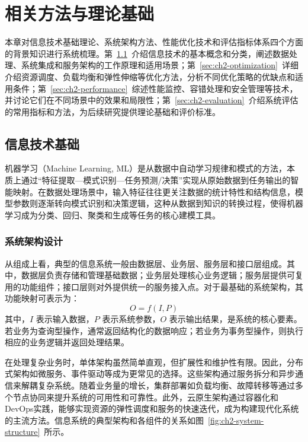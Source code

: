
\chapter{相关方法与理论基础}\label{ch:prelim}

本章对信息技术基础理论、系统架构方法、性能优化技术和评估指标体系四个方面的背景知识进行系统梳理。第~\ref{sec:ch2-fundamentals}~介绍信息技术的基本概念和分类，阐述数据处理、系统集成和服务架构的工作原理和适用场景；第~\ref{sec:ch2-optimization}~详细介绍资源调度、负载均衡和弹性伸缩等优化方法，分析不同优化策略的优缺点和适用条件；第~\ref{sec:ch2-performance}~综述性能监控、容错处理和安全管理等技术，并讨论它们在不同场景中的效果和局限性；第~\ref{sec:ch2-evaluation}~介绍系统评估的常用指标和方法，为后续研究提供理论基础和评价标准。

\section{信息技术基础}\label{sec:ch2-fundamentals}

机器学习（Machine Learning, ML）是从数据中自动学习规律和模式的方法，本质上通过``特征提取---模式识别---任务预测/决策''实现从原始数据到任务输出的智能映射。在数据处理场景中，输入特征往往更关注数据的统计特性和结构信息，模型参数则逐渐转向模式识别和决策逻辑，这种从数据到知识的转换过程，使得机器学习成为分类、回归、聚类和生成等任务的核心建模工具。

\subsection{系统架构设计}\label{sec:ch2-system-structure}

从组成上看，典型的信息系统一般由数据层、业务层、服务层和接口层组成。其中，数据层负责存储和管理基础数据；业务层处理核心业务逻辑；服务层提供可复用的功能组件；接口层则对外提供统一的服务接入点。对于最基础的系统架构，其功能映射可表示为：
\begin{equation}
  O = f(I, P)
\end{equation}
其中，\(I\) 表示输入数据，\(P\) 表示系统参数，\(O\) 表示输出结果，是系统的核心要素。若业务为查询型操作，通常返回结构化的数据响应；若业务为事务型操作，则执行相应的业务逻辑并返回处理结果。

在处理复杂业务时，单体架构虽然简单直观，但扩展性和维护性有限。因此，分布式架构如微服务、事件驱动等成为更常见的选择。这些架构通过服务拆分和异步通信来解耦复杂系统。随着业务量的增长，集群部署如负载均衡、故障转移等通过多个节点协同来提升系统的可用性和可靠性。此外，云原生架构通过容器化和DevOps实践，能够实现资源的弹性调度和服务的快速迭代，成为构建现代化系统的主流方法。信息系统的典型架构和各组件的关系如图~\ref{fig:ch2-system-structure}~所示。

